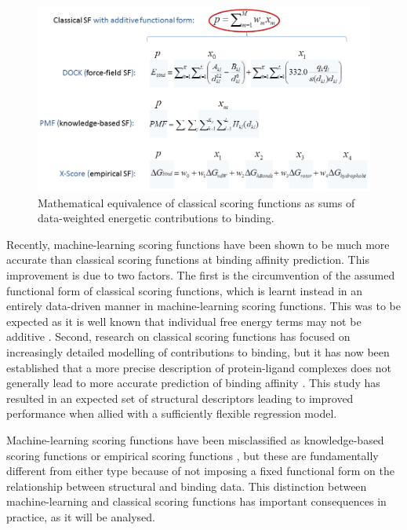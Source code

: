 \begin{figure}
\centering
\includegraphics[width=\linewidth]{../rfscore3/ClassicalScoringFunctions.png}
\caption{Mathematical equivalence of classical scoring functions as sums of data-weighted energetic contributions to binding.}
\label{rfscore3:ClassicalScoringFunctions}
\end{figure}

Recently, machine-learning scoring functions have been shown \citep{564} to be much more accurate than classical scoring functions at binding affinity prediction. This improvement is due to two factors. The first is the circumvention of the assumed functional form of classical scoring functions, which is learnt instead in an entirely data-driven manner in machine-learning scoring functions. This was to be expected as it is well known that individual free energy terms may not be additive \citep{1471,1416}. Second, research on classical scoring functions has focused on increasingly detailed modelling of contributions to binding, but it has now been established that a more precise description of protein-ligand complexes does not generally lead to more accurate prediction of binding affinity \citep{1370}. This study has resulted in an expected set of structural descriptors leading to improved performance when allied with a sufficiently flexible regression model.

Machine-learning scoring functions have been misclassified as knowledge-based scoring functions \citep{1373,1372} or empirical scoring functions \citep{1305}, but these are fundamentally different from either type because of not imposing a fixed functional form on the relationship between structural and binding data. This distinction between machine-learning and classical scoring functions has important consequences in practice, as it will be analysed.

